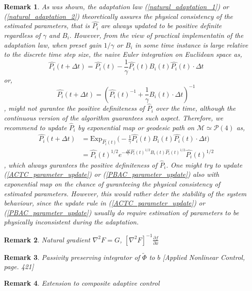 \documentclass[Afour,sageh,times]{sagej}
\newtheorem{remark}{Remark}
\begin{document}
\begin{remark}
As was shown, the adaptation law (\ref{natural_adaptation_1}) or (\ref{natural_adaptation_2}) theoretically assures the physical consistency of the estimated parameters, that is $\hat{P_i}$ are always updated to be positive definite regardless of $\gamma$ and $B_{i}$. However, from the view of practical implementatin of the adaptation law, when preset gain $1/\gamma$ or $B_{i}$ in some time instance is large relative to the discrete time step size, the naive Euler integration on Euclidean space as,
\begin{equation*}
\hat{P_i}(t+\Delta t) = \hat{P_i}(t) - \frac{1}{\gamma}\hat{P_i}(t)B_{i}(t)\hat{P_i}(t)\cdot\Delta t
\end{equation*}
or,
\begin{equation*}
\hat{P_i}(t+\Delta t) = (\hat{P_i}(t)^{-1} + \frac{1}{\gamma}B_{i}(t)\cdot\Delta t)^{-1}
\end{equation*}
, might not gurantee the positive definiteness of $\hat{P}_i$ over the time, although the continuous version of the algorithm guarantees such aspect. Therefore, we recommend to update $\hat{P}_i$ by exponential map or geodesic path on $\mathcal{M} \simeq \mathcal{P}(4)$ as,
\begin{align}
\hat{P_i}(t+\Delta t) &= \mathrm{Exp}_{\hat{P_i}(t)}\bigg(-\frac{1}{\gamma}\hat{P_i}(t)B_{i}(t)\hat{P_i}(t)\cdot\Delta t\bigg) \nonumber\\
&=\hat{P_i}(t)^{1/2}e^{-\frac{\Delta t}{\gamma}\hat{P_i}(t)^{1/2}B_i(t)\hat{P_i}(t)^{1/2}}\hat{P_i}(t)^{1/2} \label{natural_adaptation_discrete}
\end{align}
, which always gurantees the positive definiteness of $\hat{P}_i$. One might try to update (\ref{ACTC_parameter_update}) or (\ref{PBAC_parameter_update}) also with exponential map on the chance of guranteeing the physical consistency of estimated parameters. However, this would rather deter the stability of the system behaviour, since the update rule in (\ref{ACTC_parameter_update}) or (\ref{PBAC_parameter_update}) usually do require estimation of parameters to be physically inconsistent during the adaptation.
\end{remark}
\begin{remark}
Natural gradient $\nabla^2 F = G$, $[\nabla^2 F]^{-1}\frac{\partial f}{\partial x}$
\end{remark}
\begin{remark}
Passivity preserving integrator of $\tilde{\Phi}$ to $b$ [Applied Nonlinear Control, page. 421]
\end{remark}
\begin{remark}
Extension to composite adaptive control
\end{remark}
\end{document}
